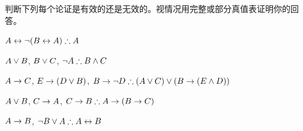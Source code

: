 \noindent\problempart
判断下列每个论证是有效的还是无效的。视情况用完整或部分真值表证明你的回答。
\label{pr.TT.valid6}

\begin{compactlist}
\item $A\eiff\enot(B\eiff A)\therefore A$ %
\item $A\vee B$, $B\vee C$, $\enot A\therefore B \eand C$ %
\item $A \rightarrow C$, $E \rightarrow (D \vee B)$, $B \eif \enot D\therefore (A \eor C) \eor (B \eif (E \eand D))$ %
\item $A \vee B$, $C \rightarrow A$, $C \eif B\therefore A \eif (B \eif C)$ %
\item $A \rightarrow B$, $\enot B \eor A\therefore A \eiff B$ %
\end{compactlist}
